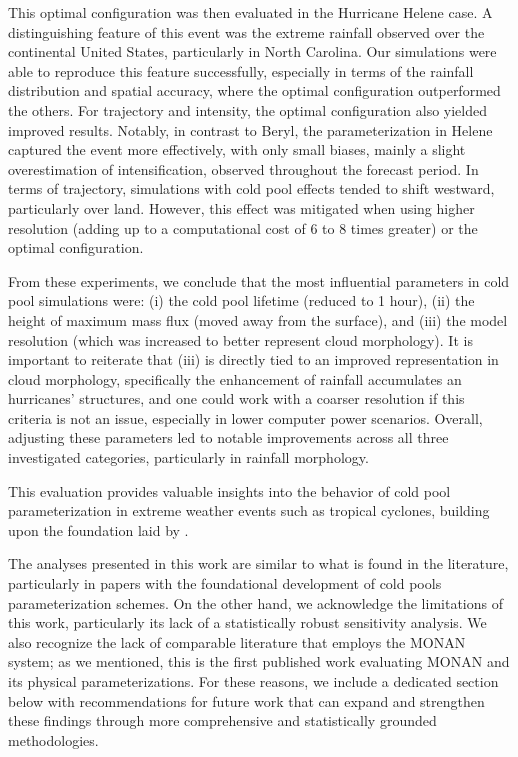 This optimal configuration was then evaluated in the Hurricane Helene case. A distinguishing feature of this event was the extreme rainfall observed over the continental United States, particularly in North Carolina. Our simulations were able to reproduce this feature successfully, especially in terms of the rainfall distribution and spatial accuracy, where the optimal configuration outperformed the others. For trajectory and intensity, the optimal configuration also yielded improved results. Notably, in contrast to Beryl, the parameterization in Helene captured the event more effectively, with only small biases, mainly a slight overestimation of intensification, observed throughout the forecast period. In terms of trajectory, simulations with cold pool effects tended to shift westward, particularly over land. However, this effect was mitigated when using higher resolution (adding up to a computational cost of 6 to 8 times greater) or the optimal configuration.

From these experiments, we conclude that the most influential parameters in cold pool simulations were: (i) the cold pool lifetime (reduced to 1 hour), (ii) the height of maximum mass flux (moved away from the surface), and (iii) the model resolution (which was increased to better represent cloud morphology). It is important to reiterate that (iii) is directly tied to an improved representation in cloud morphology, specifically the enhancement of rainfall accumulates an hurricanes' structures, and one could work with a coarser resolution if this criteria is not an issue, especially in lower computer power scenarios. Overall, adjusting these parameters led to notable improvements across all three investigated categories, particularly in rainfall morphology.

This evaluation provides valuable insights into the behavior of cold pool parameterization in extreme weather events such as tropical cyclones, building upon the foundation laid by .

The analyses presented in this work are similar to what is found in the literature, particularly in papers with the foundational development of cold pools parameterization schemes. On the other hand, we acknowledge the limitations of this work, particularly its lack of a statistically robust sensitivity analysis. We also recognize the lack of comparable literature that employs the MONAN system; as we mentioned, this is the first published work evaluating MONAN and its physical parameterizations. For these reasons, we include a dedicated section below with recommendations for future work that can expand and strengthen these findings through more comprehensive and statistically grounded methodologies.


